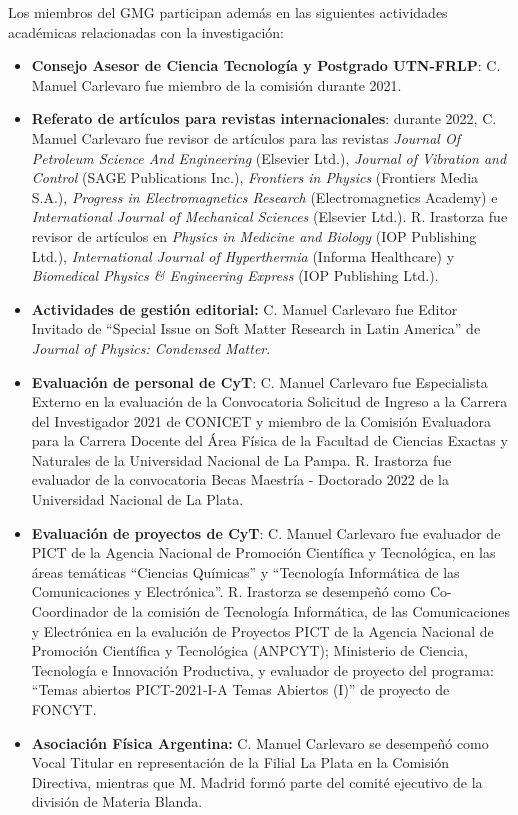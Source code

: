 \documentclass[a4paper,11pt,twoside,final,titlepage,onecolumn,openright]{report}
\begin{document}
Los miembros del GMG participan además en las siguientes actividades académicas relacionadas con la investigación:

\begin{itemize}
  \item \textbf{Consejo Asesor de Ciencia Tecnología y Postgrado UTN-FRLP}: C. Manuel Carlevaro fue miembro de la comisión durante 2021. 
  
  \item \textbf{Referato de artículos para revistas internacionales}: durante 2022, C. Manuel Carlevaro fue revisor de artículos para las revistas \textit{Journal Of Petroleum Science And Engineering} (Elsevier Ltd.), \textit{Journal of Vibration and Control} (SAGE Publications Inc.), \textit{Frontiers in Physics} (Frontiers Media S.A.), \textit{Progress in Electromagnetics Research} (Electromagnetics Academy) e \textit{International Journal of Mechanical Sciences} (Elsevier Ltd.). R. Irastorza fue revisor de artículos en \textit{Physics in Medicine and Biology} (IOP Publishing Ltd.), \textit{International Journal of Hyperthermia} (Informa Healthcare) y \textit{Biomedical Physics \& Engineering Express} (IOP Publishing Ltd.).
 
 \item \textbf{Actividades de gestión editorial:} C. Manuel Carlevaro fue Editor Invitado de ``Special Issue on Soft Matter Research in Latin America'' de \textit{Journal of Physics: Condensed Matter}.
 
     \item \textbf{Evaluación de personal de CyT}: C. Manuel Carlevaro fue Especialista Externo en la evaluación de la Convocatoria Solicitud de Ingreso a la Carrera del Investigador 2021 de CONICET y miembro de la Comisión Evaluadora para la Carrera Docente del Área Física de la Facultad de Ciencias Exactas y Naturales de la Universidad Nacional de La Pampa. R. Irastorza fue evaluador de la convocatoria Becas Maestría - Doctorado 2022 de la Universidad Nacional de La Plata.


\item \textbf{Evaluación de proyectos de CyT}: C. Manuel Carlevaro fue evaluador de PICT de la Agencia Nacional de Promoción Científica y Tecnológica, en las áreas temáticas ``Ciencias Químicas'' y ``Tecnología Informática de las Comunicaciones y Electrónica''. R. Irastorza se desempeñó como Co-Coordinador de la comisión de Tecnología Informática, de las Comunicaciones y Electrónica en la evalución de Proyectos PICT de la Agencia Nacional de Promoción Científica y Tecnológica (ANPCYT); Ministerio de Ciencia, Tecnología e Innovación Productiva, y evaluador de proyecto del programa: ``Temas abiertos PICT-2021-I-A Temas Abiertos (I)'' de proyecto de FONCYT.
 
\item \textbf{Asociación Física Argentina:} C. Manuel Carlevaro se desempeñó como Vocal Titular en representación de la Filial La Plata en la Comisión Directiva, mientras que M. Madrid formó parte del comité ejecutivo de la división de Materia Blanda.
 
\end{itemize}
\end{document}
